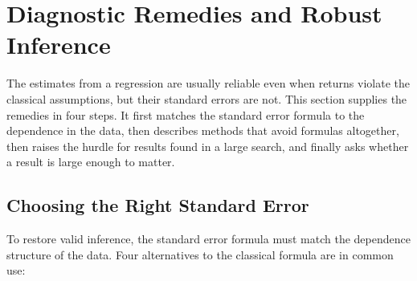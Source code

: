 \section{Diagnostic Remedies and Robust Inference}
\label{sec:03-se}

The estimates from a regression are usually reliable even when returns violate the classical assumptions, but their standard errors are not. This section supplies the remedies in four steps. It first matches the standard error formula to the dependence in the data, then describes methods that avoid formulas altogether, then raises the hurdle for results found in a large search, and finally asks whether a result is large enough to matter.

\subsection{Choosing the Right Standard Error}
\label{sec:03-se-choice}
To restore valid inference, the standard error formula must match the dependence structure of the data. Four alternatives to the classical formula are in common use:
